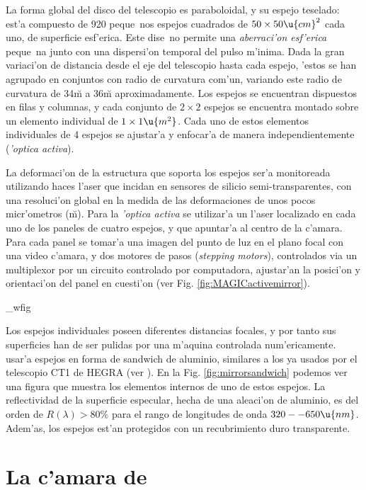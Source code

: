 La forma global del disco del telescopio es paraboloidal, y su espejo
teselado: est'a compuesto de 920 peque~nos espejos cuadrados de
$50\times 50 \u{cm}^2$ cada uno, de superficie esf'erica. Este dise~no
permite una \emph{aberraci'on esf'erica} peque~na junto con una
dispersi'on temporal del pulso \Cerenkov m'inima. Dada la gran
variaci'on de distancia desde el eje del telescopio hasta cada espejo,
'estos se han agrupado en conjuntos con radio de curvatura com'un,
variando este radio de curvatura de 34\u{m} a 36\u{m} aproximadamente.
Los espejos se encuentran dispuestos en filas y columnas, y cada
conjunto de $2 \times 2$ espejos se encuentra montado sobre un
elemento individual de $1 \times 1 \u{m^2}$. Cada uno de estos
elementos individuales de 4 espejos se ajustar'a y enfocar'a de manera
independientemente (\emph{'optica activa}).

La deformaci'on de la estructura que soporta los espejos ser'a
monitoreada utilizando haces l'aser que incidan en sensores de silicio
semi-transparentes, con una resoluci'on global en la medida de las
deformaciones de unos pocos micr'ometros (\u{\mu m}). Para la
\emph{'optica activa} se utilizar'a un l'aser localizado en cada uno 
de los paneles de cuatro espejos, y que apuntar'a al centro de la
c'amara. Para cada panel se tomar'a una imagen del punto de luz en el
plano focal con una video c'amara, y dos motores de pasos
(\emph{stepping motors}), controlados via un multiplexor por un
circuito controlado por computadora, ajustar'an la posici'on y
orientaci'on del panel en cuesti'on (ver
Fig. \ref{fig:MAGICactivemirror}).

\MAGICmirrorcontrol_wfig

Los espejos individuales poseen diferentes distancias focales, y por
tanto sus superficies han de ser pulidas por una m'aquina controlada
num'ericamente. \MAGIC usar'a espejos en forma de sandwich
de aluminio, similares a los ya usados por el telescopio CT1 de HEGRA (ver
). En la Fig. \ref{fig:mirrorsandwich}
podemos ver una figura que muestra los elementos internos de uno de
estos espejos. La reflectividad de la superficie especular, hecha de
una aleaci'on de aluminio, es del orden de $R(\lambda) >
80\%$ para el rango de longitudes de onda $320--650\u{nm}$. Adem'as,
los espejos est'an protegidos con un recubrimiento duro transparente.

\section{La c'amara de \MAGIC}
%
